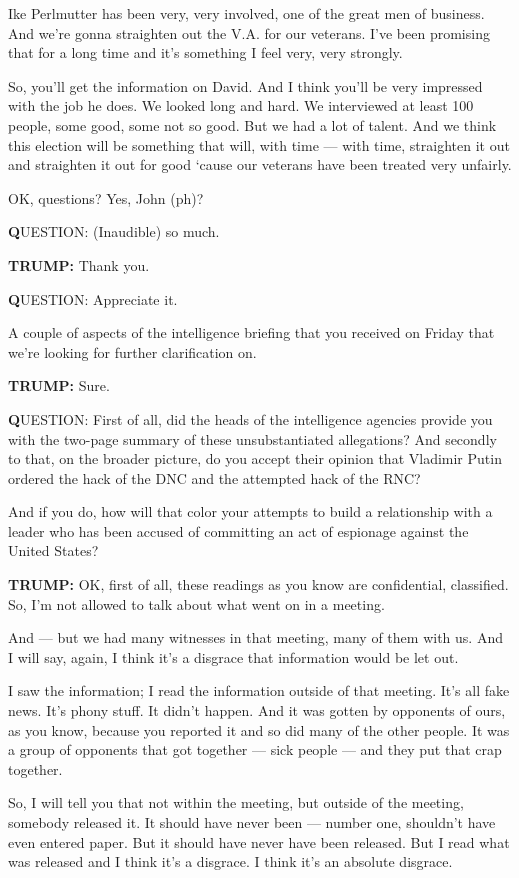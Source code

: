 Ike Perlmutter has been very, very involved, one of the great men of
business. And we're gonna straighten out the V.A. for our veterans. I've
been promising that for a long time and it's something I feel very, very
strongly.

So, you'll get the information on David. And I think you'll be very
impressed with the job he does. We looked long and hard. We interviewed
at least 100 people, some good, some not so good. But we had a lot of
talent. And we think this election will be something that will, with
time --- with time, straighten it out and straighten it out for good
`cause our veterans have been treated very unfairly.

OK, questions? Yes, John (ph)?

\textbf{Q}UESTION: (Inaudible) so much.

\textbf{TRUMP:} Thank you.

\textbf{Q}UESTION: Appreciate it.

A couple of aspects of the intelligence briefing that you received on
Friday that we're looking for further clarification on.

\textbf{TRUMP:} Sure.

\textbf{Q}UESTION: First of all, did the heads of the intelligence
agencies provide you with the two-page summary of these unsubstantiated
allegations? And secondly to that, on the broader picture, do you accept
their opinion that Vladimir Putin ordered the hack of the DNC and the
attempted hack of the RNC?

And if you do, how will that color your attempts to build a relationship
with a leader who has been accused of committing an act of espionage
against the United States?

\textbf{TRUMP:} OK, first of all, these readings as you know are
confidential, classified. So, I'm not allowed to talk about what went on
in a meeting.

And --- but we had many witnesses in that meeting, many of them with us.
And I will say, again, I think it's a disgrace that information would be
let out.

I saw the information; I read the information outside of that meeting.
It's all fake news. It's phony stuff. It didn't happen. And it was
gotten by opponents of ours, as you know, because you reported it and so
did many of the other people. It was a group of opponents that got
together --- sick people --- and they put that crap together.

So, I will tell you that not within the meeting, but outside of the
meeting, somebody released it. It should have never been --- number one,
shouldn't have even entered paper. But it should have never have been
released. But I read what was released and I think it's a disgrace. I
think it's an absolute disgrace.

